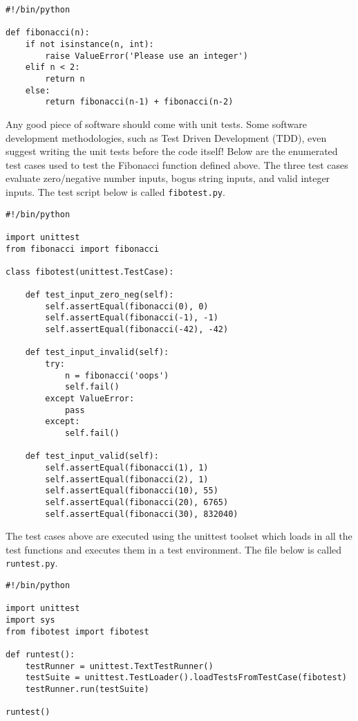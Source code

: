\begin{verbatim}
#!/bin/python

def fibonacci(n):
    if not isinstance(n, int):
        raise ValueError('Please use an integer')
    elif n < 2:
        return n
    else:
        return fibonacci(n-1) + fibonacci(n-2)
\end{verbatim}

Any good piece of software should come with unit tests. Some software
development methodologies, such as Test Driven Development (TDD), even suggest
writing the unit tests before the code itself! Below are the enumerated test
cases used to test the Fibonacci function defined above. The three test cases
evaluate zero/negative number inputs, bogus string inputs, and valid integer
inputs. The test script below is called \verb|fibotest.py|.

\begin{verbatim}
#!/bin/python

import unittest
from fibonacci import fibonacci

class fibotest(unittest.TestCase):

    def test_input_zero_neg(self):
        self.assertEqual(fibonacci(0), 0)
        self.assertEqual(fibonacci(-1), -1)
        self.assertEqual(fibonacci(-42), -42)

    def test_input_invalid(self):
        try:
            n = fibonacci('oops')
            self.fail()
        except ValueError:
            pass
        except:
            self.fail()

    def test_input_valid(self):
        self.assertEqual(fibonacci(1), 1)
        self.assertEqual(fibonacci(2), 1)
        self.assertEqual(fibonacci(10), 55)
        self.assertEqual(fibonacci(20), 6765)
        self.assertEqual(fibonacci(30), 832040)
\end{verbatim}

The test cases above are executed using the unittest toolset which loads in
all the test functions and executes them in a test environment. The file
below is called \verb|runtest.py|.

\begin{verbatim}
#!/bin/python

import unittest
import sys
from fibotest import fibotest

def runtest():
    testRunner = unittest.TextTestRunner()
    testSuite = unittest.TestLoader().loadTestsFromTestCase(fibotest)
    testRunner.run(testSuite)

runtest()
\end{verbatim}

